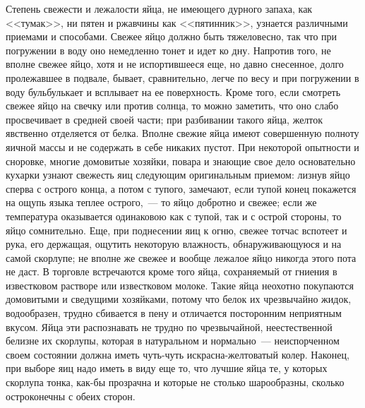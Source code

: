 Степень свежести и лежалости яйца, не имеющего дурного запаха, как <<тумак>>, ни пятен и ржавчины как <<пятинник>>, узнается различными приемами и способами. Свежее яйцо должно быть тяжеловесно, так что при погружении в воду оно немедленно тонет и идет ко дну. Напротив того, не вполне свежее яйцо, хотя и не испортившееся еще, но давно снесенное, долго пролежавшее в подвале, бывает, сравнительно, легче по весу и при погружении в воду бульбулькает и всплывает на ее поверхность. Кроме того, если смотреть свежее яйцо на свечку или против солнца, то можно заметить, что оно слабо просвечивает в средней своей части; при разбивании такого яйца, желток явственно отделяется от белка. Вполне свежие яйца имеют совершенную полноту яичной массы и не содержать в себе никаких пустот. При некоторой опытности и сноровке, многие домовитые хозяйки, повара и знающие свое дело основательно кухарки узнают свежесть яиц следующим оригинальным приемом: лизнув яйцо сперва с острого конца, а потом с тупого, замечают, если тупой конец покажется на ощупь языка теплее острого,~--- то яйцо добротно и свежее; если же температура оказывается одинаковою как с тупой, так и с острой стороны, то яйцо сомнительно. Еще, при поднесении яиц к огню, свежее тотчас вспотеет и рука, его держащая, ощутить некоторую влажность, обнаруживающуюся и на самой скорлупе; не вполне же свежее и вообще лежалое яйцо никогда этого пота не даст. В торговле встречаются кроме того яйца, сохраняемый от гниения в известковом растворе или известковом молоке. Такие яйца неохотно покупаются домовитыми и сведущими хозяйками, потому что белок их чрезвычайно жидок, водообразен, трудно сбивается в пену и отличается посторонним неприятным вкусом. Яйца эти распознавать не трудно по чрезвычайной, неестественной белизне их скорлупы, которая в натуральном и нормально~--- неиспорченном своем состоянии должна иметь чуть-чуть искрасна-желтоватый колер. Наконец, при выборе яиц надо иметь в виду еще то, что лучшие яйца те, у которых скорлупа тонка, как-бы прозрачна и которые не столько шарообразны, сколько остроконечны с обеих сторон.

